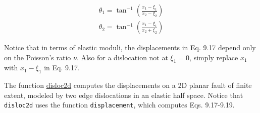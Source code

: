 \documentclass[a4paper , 12pt]{book}
\newcommand{\code}[1]{\colorbox{light-gray}{\texttt{#1}}}
\begin{document}
\begin{equation}
    \begin{gathered}
        \theta_{1}=\tan ^{-1}\left(\frac{x_{1}-\xi_{1}}{x_{2}-\xi_{2}}\right) \\
        \theta_{2}=\tan ^{-1}\left(\frac{x_{1}-\xi_{1}}{x_{2}+\xi_{2}}\right)
    \end{gathered}
\end{equation}

Notice that in terms of elastic moduli, the displacements in Eq. 9.17 depend only on the Poisson's ratio $\nu$. Also for a dislocation not at $\xi_1 = 0$, simply replace $x_1$ with $x_1 - \xi_1$ in Eq. 9.17.

The function \href{https://github.com/nfcd/compGeo/blob/master/source/functions/disloc2d.py}{disloc2d} computes the displacements on a 2D planar fault of finite extent, modeled by two edge dislocations in an elastic half space. Notice that \code{disloc2d} uses the function \code{displacement}, which computes Eqs. 9.17-9.19.
\end{document}
